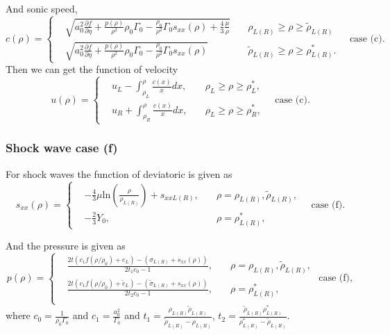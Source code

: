 \documentclass[review]{elsarticle}
\begin{document}
And sonic speed,
\begin{equation}
  c(\rho) = \left\{ \begin{aligned}
	&  \sqrt{a_0^2 \frac{\partial f}{\partial \eta} + \frac{p(\rho)}{\rho^2}\rho_0\Gamma_0 -\frac{\rho_0}{\rho^2}\Gamma_0 s_{xx}(\rho) +\frac{4}{3}\frac{\mu}{\rho}} \quad  & \rho_{L(R)} \ge \rho \ge \tilde{\rho}_{L(R)}\\
	&	\sqrt{a_0^2 \frac{\partial f}{\partial \eta} + \frac{p(\rho)}{\rho^2}\rho_0\Gamma_0 -\frac{\rho_0}{\rho^2}\Gamma_0 s_{xx}(\rho)}  \quad  &   \tilde{\rho}_{L(R)} \ge \rho \ge \rho_{L(R)}^*.
  \end{aligned}\right. \quad \text{case (c)}.
\end{equation}
Then we can get  the   function of  velocity
\begin{equation}
  u(\rho) =\left\{ \begin{aligned} 
	&u_L - \int_{\rho_L}^{\rho} \frac{c(x)}{x} dx, \quad &  \rho_L\ge \rho\ge \rho_L^* , \\
	&u_R + \int_{\rho_R}^{\rho} \frac{c(x)}{x} dx, \quad &  \rho_L\ge \rho\ge  \rho_R^* , 
	\end{aligned}
  \right. \quad \text{case (c)}.
\end{equation}
\subsubsection{Shock wave case (f)}
For shock waves the function of deviatoric is given as 
\begin{equation}
  s_{xx}(\rho) = \left\{\begin{aligned}
	  & -\frac{4}{3}\mu\text{ln}\left(\frac{\rho}{\rho_{L(R)}}\right)+s_{xxL(R)},\quad &  \rho =\rho_{L(R)},\tilde{\rho}_{L(R)},\\
	  & -\frac{2}{3}Y_0, \quad  & \rho = \rho_{L(R)}^*,
  \end{aligned} \right. \quad  \text{case (f)}.
  \end{equation}

And the pressure is given as
\begin{equation}
  p(\rho)= \left\{\begin{aligned} 
	  & \frac{2t(c_1f(\rho/\rho_0)+e_L)-(\sigma_{L(R)}+s_{xx}(\rho))}{2t_1c_0-1}, \quad  &  \rho=\rho_{L(R)},\tilde{\rho}_{L(R)},\\ 
	  & \frac{2t(c_1f(\rho/\rho_0)+\tilde{e}_L)-(\tilde{\sigma}_{L(R)}+s_{xx}(\rho))}{2t_2c_0-1}, \quad  &  \rho=\rho_{L(R)}^*,\\ 
  \end{aligned}\right.
  \text{ case (f)},
\end{equation}
where $c_0 = \frac{1}{\rho_0\Gamma_0}$ and $c_1 = \frac{a_0^2}{\Gamma_0}$ and $ t_1=\frac{\rho_{L(R)} \tilde{\rho}_{L(R)}}{\tilde{\rho}_{L(R)}-\rho_{L(R)}}$, $ t_2=\frac{\tilde{\rho}_{L(R)} \rho_{L(R)}^*}{\rho_{L(R)}^*-\tilde{\rho}_{L(R)}}$.
\end{document}
